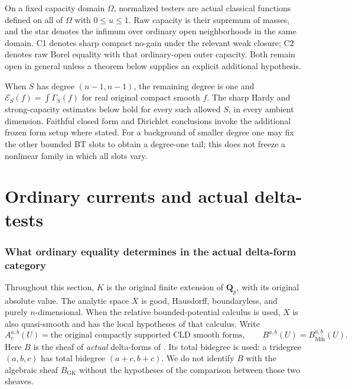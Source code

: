 \documentclass[11pt,a4paper]{article}
\numberwithin{equation}{section}
\theoremstyle{definition}
\theoremstyle{remark}
\begin{document}
On a fixed capacity domain $\Omega$, normalized testers are actual
classical functions defined on all of $\Omega$ with $0\le u\le1$.
Raw capacity is their supremum of masses, and the star denotes the
infimum over ordinary open neighborhoods in the same domain.
C1 denotes sharp compact no-gain under the relevant weak closure;
C2 denotes raw Borel equality with that ordinary-open outer capacity.
Both remain open in general unless a theorem below supplies an
explicit additional hypothesis.

When $S$ has degree $(n-1,n-1)$, the remaining degree is one and
$\mathcal E_S(f)=\int\Gamma_S(f)$ for real original compact smooth
$f$. The sharp Hardy and strong-capacity estimates below hold for
every such allowed $S$, in every ambient dimension. Faithful closed
form and Dirichlet conclusions invoke the additional frozen form
setup where stated. For a background of smaller degree one may fix
the other bounded BT slots to obtain a degree-one tail; this does
not freeze a nonlinear family in which all slots vary.



\part{Ordinary currents and actual delta-tests}

\section{What ordinary equality determines in the actual delta-form category}
\label{sec:r6-delta-faithfulness}

Throughout this section, $K$ is the original finite extension of
$\mathbf Q_p$, with its original absolute value.  The analytic space $X$
is good, Hausdorff, boundaryless, and purely $n$-dimensional.  When the
relative bounded-potential calculus is used, $X$ is also quasi-smooth and
has the local hypotheses of that calculus.  Write
\[
 A^{a,b}_{c}(U)=\text{the original compactly supported CLD smooth forms},
 \qquad B^{a,b}(U)=B^{a,b}_{\mathrm{Mih}}(U).
\]
Here $B$ is the sheaf of \emph{actual} delta-forms of
\cite[Definition 4.2]{Mih24}.  Its total bidegree is used: a tridegree
$(a,b,c)$ has total bidegree $(a+c,b+c)$.  We do not identify $B$ with
the algebraic sheaf $B_{\mathrm{GK}}$ without the hypotheses of the
comparison between those two sheaves.
\end{document}
